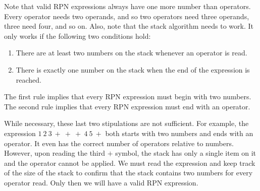 \documentclass[twocolumn]{iagproc}
\begin{document}
Note that valid RPN expressions always have one more number than operators.
Every operator needs two operands, and so two operators need three operands, three need four, and so on.
Also, note that the stack algorithm needs to work.
It only works if the following two conditions hold:
\begin{enumerate}
  \item There are at least two numbers on the stack whenever an operator is read.
  \item There is exactly one number on the stack when the end of the expression is reached.
\end{enumerate}
The first rule implies that every RPN expression must begin with two numbers.
The second rule implies that every RPN expression must end with an operator.

While necessary, these last two stipulations are not sufficient.
For example, the expression $1 \ 2 \ 3 \ + \ + \ + \ 4 \ 5 \ +$ both starts with two numbers and ends with an operator.
It even has the correct number of operators relative to numbers.
However, upon reading the third $+$ symbol, the stack has only a single item on it and the operator cannot be applied.
We must read the expression and keep track of the size of the stack to confirm that the stack contains two numbers for every operator read.
Only then we will have a valid RPN expression.

\nocite{*}


\end{document}
